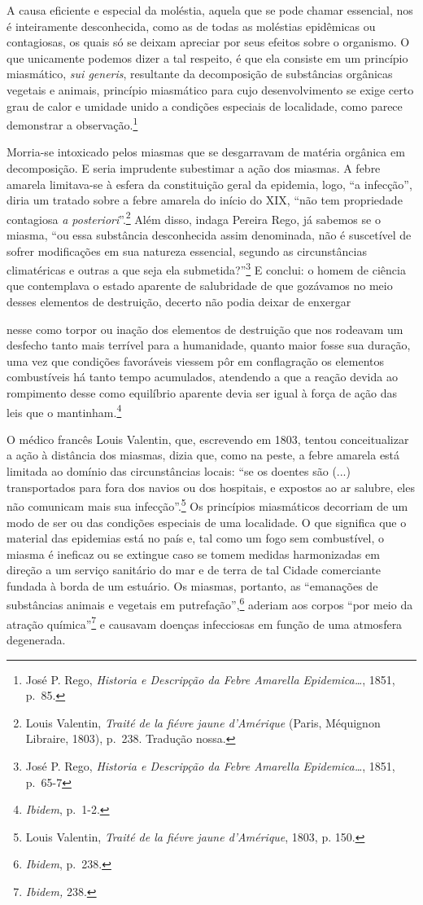 A causa eficiente e especial da moléstia, aquela que se pode chamar
essencial, nos é inteiramente desconhecida, como as de todas as
moléstias epidêmicas ou contagiosas, os quais só se deixam apreciar por
seus efeitos sobre o organismo. O que unicamente podemos dizer a tal
respeito, é que ela consiste em um princípio miasmático, \emph{sui
generis}, resultante da decomposição de substâncias orgânicas vegetais e
animais, princípio miasmático para cujo desenvolvimento se exige certo
grau de calor e umidade unido a condições especiais de localidade, como
parece demonstrar a observação.\footnote{José P. Rego, \emph{Historia e
  Descripção da Febre Amarella Epidemica\ldots{}}, 1851, p.~85.}

Morria-se intoxicado pelos miasmas que se desgarravam de matéria
orgânica em decomposição. E seria imprudente subestimar a ação dos
miasmas. A febre amarela limitava-se à esfera da constituição geral da
epidemia, logo, ``a infecção'', diria um tratado sobre a febre amarela
do início do XIX, ``não tem propriedade contagiosa \emph{a
posteriori}''.\footnote{Louis Valentin, \emph{Traité de la fiévre jaune
  d'Amérique} (Paris, Méquignon Libraire, 1803), p.~238. Tradução nossa.}
Além disso, indaga Pereira Rego, já sabemos se o miasma, ``ou essa
substância desconhecida assim denominada, não é suscetível de sofrer
modificações em sua natureza essencial, segundo as circunstâncias
climatéricas e outras a que seja ela submetida?''\footnote{José P. Rego,
  \emph{Historia e Descripção da Febre Amarella Epidemica\ldots{}},
  1851, p.~65-7} E conclui: o homem de ciência que contemplava o estado
aparente de salubridade de que gozávamos no meio desses elementos de
destruição, decerto não podia deixar de enxergar

nesse como torpor ou inação dos elementos de destruição que nos rodeavam
um desfecho tanto mais terrível para a humanidade, quanto maior fosse
sua duração, uma vez que condições favoráveis viessem pôr em
conflagração os elementos combustíveis há tanto tempo acumulados,
atendendo a que a reação devida ao rompimento desse como equilíbrio
aparente devia ser igual à força de ação das leis que o
mantinham.\footnote{\emph{Ibidem}, p.~1-2.}

O médico francês Louis Valentin, que, escrevendo em 1803, tentou
conceitualizar a ação à distância dos miasmas, dizia que, como na peste,
a febre amarela está limitada ao domínio das circunstâncias locais: ``se
os doentes são (...) transportados para fora dos navios ou dos
hospitais, e expostos ao ar salubre, eles não comunicam mais sua
infecção''.\footnote{Louis Valentin, \emph{Traité de la fiévre jaune
  d'Amérique}, 1803, p. 150.} Os princípios miasmáticos decorriam de um
modo de ser ou das condições especiais de uma localidade. O que
significa que o material das epidemias está no país e, tal como um fogo
sem combustível, o miasma é ineficaz ou se extingue caso se tomem
medidas harmonizadas em direção a um serviço sanitário do mar e de terra
de tal Cidade comerciante fundada à borda de um estuário. Os miasmas,
portanto, as ``emanações de substâncias animais e vegetais em
putrefação'',\footnote{\emph{Ibidem}, p.~238.} aderiam aos corpos ``por
meio da atração química''\footnote{\emph{Ibidem,} 238.} e causavam
doenças infecciosas em função de uma atmosfera degenerada.

